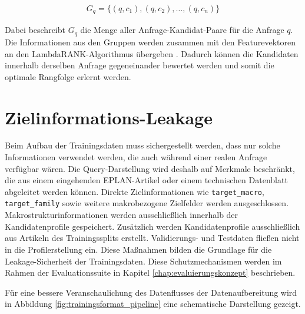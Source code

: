 \begin{align}
    G_q = \{(q,c_1),(q,c_2),\dots,(q,c_n)\}
\end{align}

Dabei beschreibt $G_q$ die Menge aller Anfrage-Kandidat-Paare für die Anfrage $q$. Die Informationen aus den Gruppen werden zusammen mit den Featurevektoren an den LambdaRANK-Algorithmus übergeben \parencite{srcStep931}. 
Dadurch können die Kandidaten innerhalb derselben Anfrage gegeneinander bewertet werden und somit die optimale Rangfolge erlernt werden.

\section{Zielinformations-Leakage} 

Beim Aufbau der Trainingsdaten muss sichergestellt werden, dass nur solche Informationen verwendet werden, die auch während einer realen Anfrage verfügbar wären. 
Die Query-Darstellung wird deshalb auf Merkmale beschränkt, die aus einem eingehenden EPLAN-Artikel oder einem technischen Datenblatt abgeleitet werden können. 
Direkte Zielinformationen wie \texttt{target\_macro}, \texttt{target\_family} sowie weitere makrobezogene Zielfelder werden ausgeschlossen. 
Makrostrukturinformationen werden ausschließlich innerhalb der Kandidatenprofile gespeichert. Zusätzlich werden Kandidatenprofile ausschließlich aus Artikeln des Trainingssplits erstellt.  
Validierungs- und Testdaten fließen nicht in die Profilerstellung ein. Diese Maßnahmen bilden die Grundlage für die Leakage-Sicherheit der Trainingsdaten. 
Diese Schutzmechanismen werden im Rahmen der Evaluationssuite in Kapitel \ref{chap:evaluierungskonzept} beschrieben.


Für eine bessere Veranschaulichung des Datenflusses der Datenaufbereitung wird in Abbildung \ref{fig:trainingsformat_pipeline} eine schematische Darstellung gezeigt.

